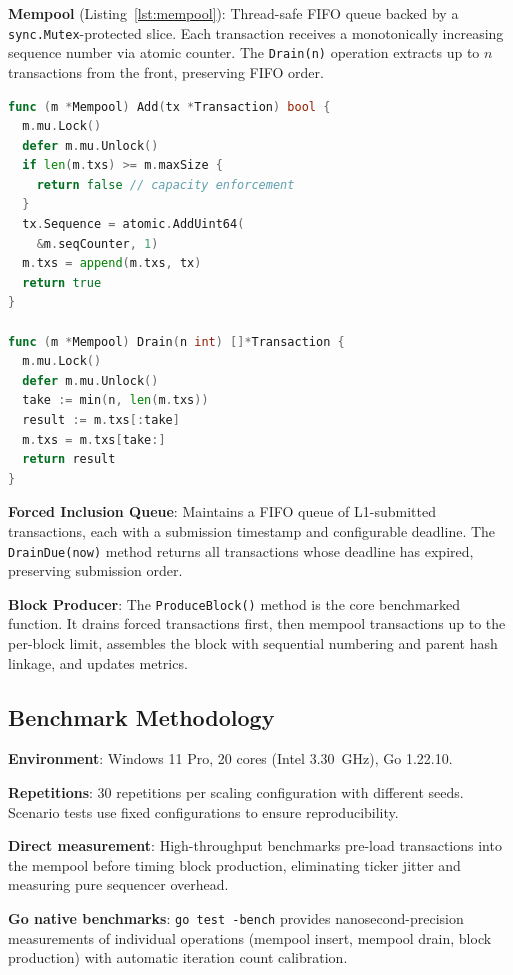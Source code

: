 \textbf{Mempool} (Listing~\ref{lst:mempool}): Thread-safe FIFO queue backed by a
\texttt{sync.Mutex}-protected slice. Each transaction receives a monotonically
increasing sequence number via atomic counter. The \texttt{Drain(n)} operation extracts
up to $n$ transactions from the front, preserving FIFO order.

\begin{lstlisting}[language=Go, caption={FIFO Mempool core operations}, label={lst:mempool}]
func (m *Mempool) Add(tx *Transaction) bool {
  m.mu.Lock()
  defer m.mu.Unlock()
  if len(m.txs) >= m.maxSize {
    return false // capacity enforcement
  }
  tx.Sequence = atomic.AddUint64(
    &m.seqCounter, 1)
  m.txs = append(m.txs, tx)
  return true
}

func (m *Mempool) Drain(n int) []*Transaction {
  m.mu.Lock()
  defer m.mu.Unlock()
  take := min(n, len(m.txs))
  result := m.txs[:take]
  m.txs = m.txs[take:]
  return result
}
\end{lstlisting}

\textbf{Forced Inclusion Queue}: Maintains a FIFO queue of L1-submitted transactions,
each with a submission timestamp and configurable deadline. The \texttt{DrainDue(now)}
method returns all transactions whose deadline has expired, preserving submission order.

\textbf{Block Producer}: The \texttt{ProduceBlock()} method is the core benchmarked
function. It drains forced transactions first, then mempool transactions up to the
per-block limit, assembles the block with sequential numbering and parent hash linkage,
and updates metrics.

\subsection{Benchmark Methodology}

\textbf{Environment}: Windows 11 Pro, 20 cores (Intel 3.30~GHz), Go 1.22.10.

\textbf{Repetitions}: 30 repetitions per scaling configuration with different seeds.
Scenario tests use fixed configurations to ensure reproducibility.

\textbf{Direct measurement}: High-throughput benchmarks pre-load transactions into the
mempool before timing block production, eliminating ticker jitter and measuring pure
sequencer overhead.

\textbf{Go native benchmarks}: \texttt{go test -bench} provides nanosecond-precision
measurements of individual operations (mempool insert, mempool drain, block production)
with automatic iteration count calibration.


